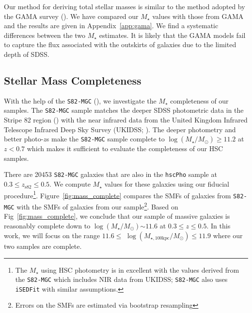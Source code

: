 \documentclass[a4paper,fleqn,usenatbib]{mnras}
\def\redm{\texttt{redMaPPer}}
\def\rbcg{\texttt{cenHighMh}}
\def\nbcg{\texttt{cenLowMh}}
\def\mstar{{$M_{\star}$}}
\def\logms{{$\log (M_{\star}/M_{\odot})$}}
\def\logmtot{{$\log (M_{\star,100\mathrm{kpc}}/M_{\odot})$}}
\begin{document}
    Our method for deriving total stellar masses is similar to the 
    method adopted by the GAMA survey (\citealt{Taylor2011, Kelvin2012}). 
    We have compared our \mstar{} values with those from GAMA and the results are given 
    in Appendix~\ref{app:gama}. 
    We find a systematic differences between the two \mstar{} estimates.
    It is likely that the GAMA models fail to capture the flux associated with the 
    outskirts of galaxies due to the limited depth of SDSS.     

\subsection{Stellar Mass Completeness}
    \label{ssec:complete}
    
    With the help of the \texttt{S82-MGC} (\citealt{Bundy2015}), we investigate the 
    \mstar{} completeness of our samples. 
    The \texttt{S82-MGC} sample matches the deeper SDSS photometric data in the 
    Stripe 82 region (\citealt{Annis2014}) with the near infrared data from the United 
    Kingdom Infrared Telescope Infrared Deep Sky Survey (UKIDSS; \citealt{Lawrence2007}). 
    The deeper photometry and better photo-$z$s make the \texttt{S82-MGC} sample complete 
    to \logms{}$\geq 11.2$ at $z<0.7$ which makes it sufficient to evaluate the 
    completeness of our HSC samples.
    
    There are 20453 \texttt{S82-MGC} galaxies that are also in the \texttt{hscPho} 
    sample at $0.3 \leq z_{\mathrm{s82}} \leq 0.5$. 
    We compute \mstar{} values for these galaxies using our fiducial 
    procedure\footnote{The \mstar{} using HSC photometry is in excellent with the 
    values derived from the \texttt{S82-MGC} which includes NIR data from UKIDSS; 
    \texttt{S82-MGC} also uses \texttt{iSEDFit} with similar assumptions.}. 
    Figure~\ref{fig:mass_complete} compares the SMFs of galaxies from 
    \texttt{S82-MGC} with the SMFs of galaxies from our 
    sample\footnote{Errors on the SMFs are estimated via bootstrap resampling}. 
    Based on Fig~\ref{fig:mass_complete}, we conclude that our sample of massive galaxies is 
    reasonably complete down to \logms{}${\sim} 11.6$ at $0.3 \leq z \leq 0.5$. 
    In this work, we will focus on the range $11.6 \le$ \logmtot{}$ \le 11.9$ 
    where our two samples are complete. 
    
\end{document}
